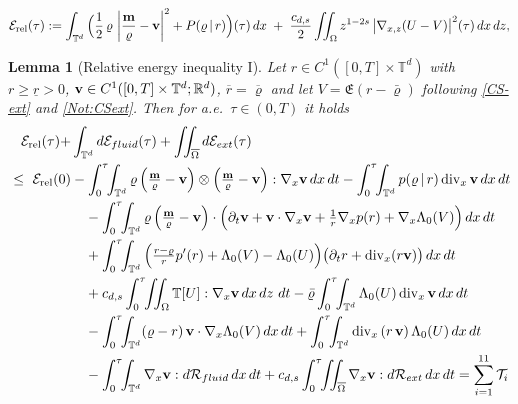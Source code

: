 \documentclass[10pt,a4paper]{amsart}
\newtheorem{lemma}{Lemma}
\newcommand{\Divx}{\operatorname{div}_x}
\newcommand{\Erel}{\mathcal{E}_{\mathrm{rel}}}
\newcommand{\Gradx}{\nabla_x}
\newcommand{\Gradxz}{\nabla_{x,z}}
\newcommand{\Lambdaz}{\Lambda_0}
\newcommand{\Ov}[1]{\overline{#1}}
\newcommand{\T}{\mathbb{T}}
\newcommand{\dt}{{\,\rm d} t }
\newcommand{\dx}{{\,\rm d} {x}}
\newcommand{\dz}{{\rm d} z}
\newcommand{\lr}[1]{\left( #1 \right)}
\newcommand{\vc}[1]{{\bf #1}}
\newcommand{\vm}{\vc{m}}
\newcommand{\vr}{\varrho}
\newcommand{\vv}{\vc{v}}
\begin{document}
		\begin{equation}\label{eq:RE}
			\Erel(\tau)
			:= \int_{\mathbb T^d}\Big( \frac12\,\vr\,\left| \frac{\vm}{\vr} - \vv\right|^2 + P(\vr\,|\,r) \Big)(\tau)\,dx
			\;+\; \frac{c_{d,s}}{2}\iint_\Omega z^{1-2s}\,\big|\Gradxz (U-V)\big|^2(\tau)\,dx\,dz,
		\end{equation}

	\begin{lemma}[Relative energy inequality I]\label{lem:generic}
		Let $r\in C^1([0,T]\times\mathbb T^d)$ with $r\ge\underline r>0$, $\vv\in C^1([0,T]\times\mathbb T^d;\mathbb R^d)$, $\Ov{r}=\Ov{\vr}$ and let $V=\mathfrak{E}(r-\bar\vr)$ following \eqref{CS-ext} and \eqref{Not:CSext}. Then for a.e.\ $\tau\in(0,T)$ it holds
	\begin{equation}\label{REI1}
		\begin{aligned}
			\Erel(\tau)+&\int_{\mathbb T^d}d\mathcal E_{fluid}(\tau)+\iint_{\overline\Omega}d\mathcal E_{ext}(\tau)
			\\
			\ \le\ \Erel(0)&-\int_0^\tau\!\!\int_{\mathbb T^d}\vr \lr{\tfrac{\vm}{\vr}-\vv}\otimes\lr{\tfrac{\vm}{\vr}-\vv}:\Gradx\vv \dx\dt 
			-\int_0^\tau\!\!\int_{\mathbb T^d}p(\vr\,|\,r)\Divx\vv\dx \dt \\
			&\quad-\int_0^\tau\!\!\int_{\mathbb T^d}\vr\lr{\tfrac{\vm}{\vr}-\vv} \cdot\Big(\partial_t\vv+\vv\cdot\Gradx\vv+\tfrac1r\Gradx p(r)+\Gradx\Lambdaz(V)\Big) \dx \dt \\
			&\quad+\int_0^\tau\!\!\int_{\mathbb T^d}\Big(\tfrac{r-\vr}{r}p'(r)+\Lambdaz(V)-\Lambdaz(U)\Big)\big(\partial_t r+\Divx(r\vv)\big) \dx \dt \\
			&\quad+c_{d,s}\int_0^\tau\!\!\iint_\Omega\T[U]:\Gradx\vv \dx\, \dz\,  \dt
			-\bar\vr\int_0^\tau\!\!\int_{\mathbb T^d}\Lambdaz(U)\Divx\vv \dx \dt \\
			&\quad-\int_0^\tau\!\!\int_{\mathbb T^d}(\vr-r)\,\vv\cdot\Gradx\Lambdaz(V) \dx \dt
			+\int_0^\tau\!\!\int_{\mathbb T^d} \Divx\lr{r\,\vv} \Lambdaz(U) \dx \dt \\
			&\quad-\int_0^\tau\!\!\int_{\mathbb T^d}\Gradx\vv:d\mathcal R_{fluid} \dx \dt 
			+c_{d,s}\int_0^\tau\!\!\iint_{\overline\Omega}\Gradx\vv:d\mathcal R_{ext} \dx \dt = \sum_{i=1}^{11}\mathcal{T}_i
		\end{aligned}
	\end{equation}
	\end{lemma}
\end{document}
